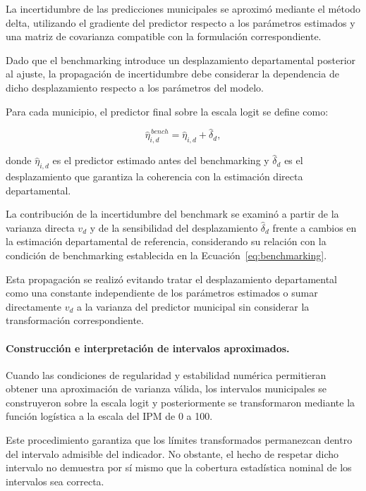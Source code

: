 La incertidumbre de las predicciones municipales se aproximó mediante el método delta, utilizando el gradiente del predictor respecto a los parámetros estimados y una matriz de covarianza compatible con la formulación correspondiente.

Dado que el benchmarking introduce un desplazamiento departamental posterior al ajuste, la propagación de incertidumbre debe considerar la dependencia de dicho desplazamiento respecto a los parámetros del modelo.

Para cada municipio, el predictor final sobre la escala logit se define como:

\begin{equation}
\widehat{\eta}_{i,d}^{\,bench}
=
\widehat{\eta}_{i,d}
+
\widehat{\delta}_d,
\label{eq:met-inc-predictor}
\end{equation}

donde $\widehat{\eta}_{i,d}$ es el predictor estimado antes del benchmarking y $\widehat{\delta}_d$ es el desplazamiento que garantiza la coherencia con la estimación directa departamental.

La contribución de la incertidumbre del benchmark se examinó a partir de la varianza directa $v_d$ y de la sensibilidad del desplazamiento $\widehat{\delta}_d$ frente a cambios en la estimación departamental de referencia, considerando su relación con la condición de benchmarking establecida en la Ecuación~\ref{eq:benchmarking}.

Esta propagación se realizó evitando tratar el desplazamiento departamental como una constante independiente de los parámetros estimados o sumar directamente $v_d$ a la varianza del predictor municipal sin considerar la transformación correspondiente.

\paragraph{Construcción e interpretación de intervalos aproximados.}

Cuando las condiciones de regularidad y estabilidad numérica permitieran obtener una aproximación de varianza válida, los intervalos municipales se construyeron sobre la escala logit y posteriormente se transformaron mediante la función logística a la escala del IPM de 0 a 100.

Este procedimiento garantiza que los límites transformados permanezcan dentro del intervalo admisible del indicador. No obstante, el hecho de respetar dicho intervalo no demuestra por sí mismo que la cobertura estadística nominal de los intervalos sea correcta.

